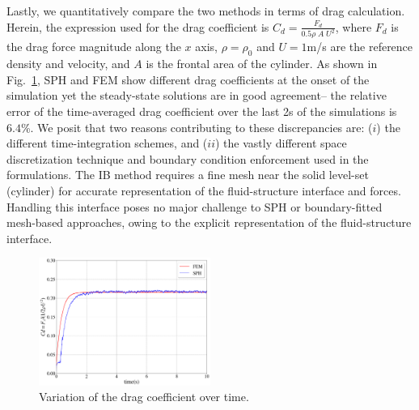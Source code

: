 Lastly, we quantitatively compare the two methods in terms of drag calculation. Herein, the expression used for the drag coefficient is $C_d=\frac{F_d}{0.5\rho\;A\; U^2}$, where $F_d$ is the drag force magnitude along the $x$ axis, $\rho=\rho_0$ and $U=1$\si{m/s} are the reference density and velocity, and $A$ is the frontal area of the cylinder.  As shown in Fig.~\ref{fig:FoC_fsi}, SPH and FEM show different drag coefficients at the onset of the simulation yet the steady-state solutions are in good agreement-- the relative error of the time-averaged drag coefficient over the last 2\si{s} of the simulations is $6.4$\%. We posit that two reasons contributing to these discrepancies are: ($i$) the different time-integration schemes, and ($ii$) the vastly different space discretization technique and boundary condition enforcement used in the formulations. The IB method requires a fine mesh near the solid level-set (cylinder) for accurate representation of the fluid-structure interface and forces. Handling this interface poses no major challenge to SPH or boundary-fitted mesh-based approaches, owing to the explicit representation of the fluid-structure interface.
\begin{figure}[H]
	\begin{center}
		\vspace{-10pt}
		\includegraphics[width=0.5\textwidth]{images/FSI_Comparison/Figure_flow_around_cylinder.png}
	\end{center}
	\caption{Variation of the drag coefficient over time.}
	\label{fig:FoC_fsi}
\end{figure}

